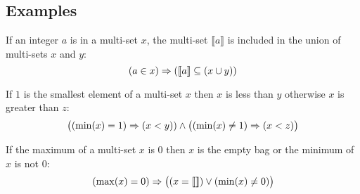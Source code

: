 %


\subsection{Examples}

\begin{myex}
If an integer $a$ is in a multi-set $x$, the multi-set $\llbracket a \rrbracket$ is included in the union of multi-sets $x$ and $y$:
\begin{equation}
\label{ex1}
(a \in x) \Rightarrow (\llbracket a \rrbracket \subseteq (x\cup y))
\end{equation}
\end{myex}

\begin{myex}
If $1$ is the smallest element of a multi-set $x$ then $x$ is less than $y$ 
otherwise $x$ is greater than $z$:
\begin{equation}
\label{ex2}
\big((\min(x) = 1) \Rightarrow (x<y)) \land \big((\min(x) \neq 1) \Rightarrow (x < z)\big)
\end{equation}
\end{myex}
\begin{myex}
If the maximum of a multi-set $x$ is $0$ then $x$ is the empty bag or the minimum of $x$ is not $0$:
\begin{equation}
\label{ex3}
(\max(x) = 0) \Rightarrow \big((x = \llbracket  \rrbracket) \lor (\min(x) \neq 0)\big)
\end{equation}
\end{myex}


